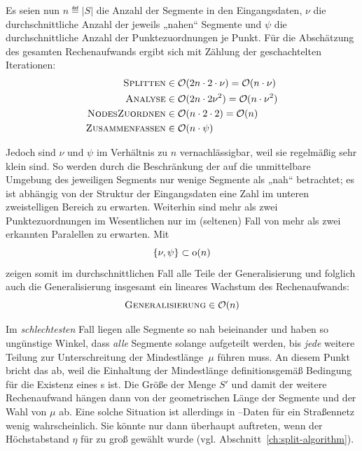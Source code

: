 \documentclass[../main/thesis.tex]{subfiles}
\begin{document}
Es seien nun $n \eqdef |S|$ die Anzahl der Segmente in den Eingangsdaten, $\nu$ die durchschnittliche Anzahl der jeweils „nahen“ Segmente und $\psi$ die durchschnittliche Anzahl der Punktezuordnungen je Punkt.
Für die Abschätzung des gesamten Rechenaufwands ergibt sich mit Zählung der geschachtelten Iterationen: 
\begin{align*}
\textproc{Splitten} &\in \mathcal{O}(2 n \cdot 2 \cdot \nu) = \mathcal{O}(n \cdot \nu)
\\
\textproc{Analyse} &\in \mathcal{O}(2 n \cdot 2 \nu^2) = \mathcal{O}(n \cdot \nu^2)
\\
\textproc{NodesZuordnen} &\in \mathcal{O}(n \cdot 2 \cdot 2) = \mathcal{O}(n)
\\
\textproc{Zusammenfassen} &\in \mathcal{O}(n \cdot \psi)
\end{align*}

Jedoch sind $\nu$ und $\psi$ im Verhältnis zu $n$ vernachlässigbar, weil sie regelmäßig sehr klein sind.
So werden durch die Beschränkung der  auf die unmittelbare Umgebung des jeweiligen Segments nur wenige Segmente als „nah“ betrachtet;
es ist abhängig von der Struktur der Eingangsdaten eine Zahl im unteren zweistelligen Bereich zu erwarten.
Weiterhin sind mehr als zwei Punktezuordnungen im Wesentlichen nur im (seltenen) Fall von mehr als zwei erkannten Paralellen zu erwarten.
Mit
\[
\{\nu, \psi\} \subset \hbox{o}(n)
\]
zeigen somit im durchschnittlichen Fall alle Teile der Generalisierung und folglich auch die Generalisierung insgesamt ein lineares Wachstum des Rechenaufwands:
\[
\textproc{Generalisierung} \in \mathcal{O}(n)
\]


Im \emph{schlechtesten} Fall liegen alle Segmente so nah beieinander und haben so ungünstige Winkel, dass \emph{alle} Segmente solange aufgeteilt werden, bis \emph{jede} weitere Teilung zur Unterschreitung der Mindestlänge~$\mu$ führen muss.
An diesem Punkt bricht das  ab, weil die Einhaltung der Mindestlänge definitionsgemäß Bedingung für die Existenz eines s ist.
Die Größe der Menge $S'$ und damit der weitere Rechenaufwand hängen dann von der geometrischen Länge der Segmente und der Wahl von $\mu$ ab.
Eine solche Situation ist allerdings in --Daten für ein Straßennetz wenig wahrscheinlich.
Sie könnte nur dann überhaupt auftreten, wenn der Höchstabstand $\eta$ für  zu groß gewählt wurde (vgl. Abschnitt~\ref{ch:split-algorithm}).
\end{document}

